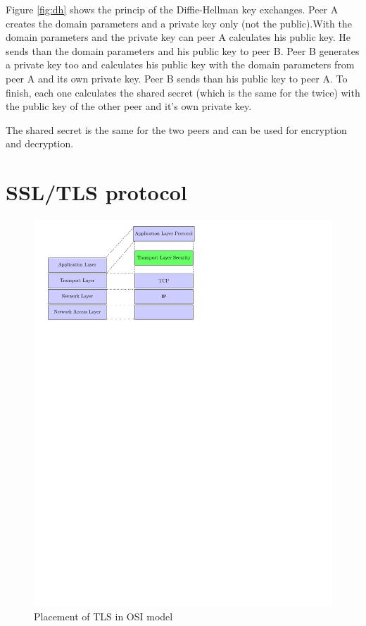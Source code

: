 Figure \ref{fig:dh} shows the princip of the Diffie-Hellman key
exchanges.\newline 
Peer A creates the domain parameters and a private key only (not the
public).\newline With the domain parameters and the private key can peer A
calculates his public key.\newline
He sends than the domain parameters and his public key to peer B.\newline
Peer B generates a private key too and calculates his public key with the domain
parameters from peer A and its own private key.\newline
Peer B sends than his public key to peer A.\newline
To finish, each one calculates the shared secret (which is the same for the
twice) with the public key of the other peer and it's own private key.\newline

The shared secret is the same for the two peers and can be used for encryption
and decryption.

\newpage


\section{SSL/TLS protocol} %
\label{intro_tls}

\begin{figure}[!ht]
\centering
\includegraphics[trim=0cm 20cm 8cm 0cm]{figures/tls_osi.pdf}
\caption{Placement of TLS in OSI model}
\label{fig:osi}

\end{figure}

